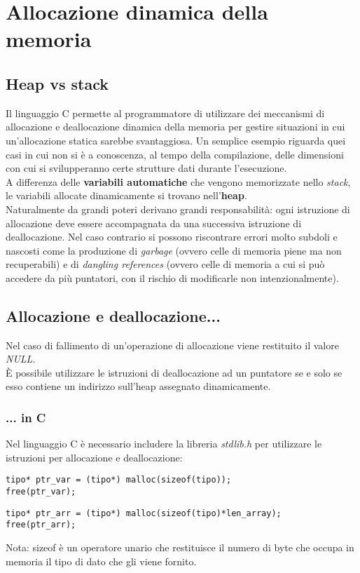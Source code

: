 \chapter{Allocazione dinamica della memoria}\label{memoriaDin}
\section{Heap vs stack}
Il linguaggio C permette al programmatore di utilizzare dei meccanismi di allocazione e deallocazione dinamica della memoria per gestire situazioni in cui un’allocazione statica sarebbe svantaggiosa. Un semplice esempio riguarda quei casi in cui non si è a conoscenza, al tempo della compilazione, delle dimensioni con cui si svilupperanno certe strutture dati durante l'esecuzione.\\
A differenza delle \textbf{variabili automatiche} che vengono memorizzate nello \textit{stack}, le variabili allocate dinamicamente si trovano nell'\textbf{heap}.\\
Naturalmente da grandi poteri derivano grandi responsabilità: ogni istruzione di allocazione deve essere accompagnata da una successiva istruzione di deallocazione. Nel caso contrario si possono riscontrare errori molto subdoli e nascosti come la produzione di \textit{garbage} (ovvero celle di memoria piene ma non recuperabili) e di \textit{dangling references} (ovvero celle di memoria a cui si può accedere da più puntatori, con il rischio di modificarle non intenzionalmente).

\section{Allocazione e deallocazione...}
Nel caso di fallimento di un'operazione di allocazione viene restituito il valore \textit{NULL}.\\
\`{E} possibile utilizzare le istruzioni di deallocazione ad un puntatore se e solo se esso contiene un indirizzo sull'heap assegnato dinamicamente.
\subsection{... in C}
Nel linguaggio C è necessario includere la libreria \textit{stdlib.h} per utilizzare le istruzioni per allocazione e deallocazione:
\begin{lstlisting}[title={Allocazione e deallocazione dinamica di una variabile in C}]
tipo* ptr_var = (tipo*) malloc(sizeof(tipo));
free(ptr_var);
\end{lstlisting}
\begin{lstlisting}[title={Allocazione e deallocazione dinamica di un vettore in C}]
tipo* ptr_arr = (tipo*) malloc(sizeof(tipo)*len_array);
free(ptr_arr);
\end{lstlisting}
Nota: \colorbox{light-gray}{sizeof} è un operatore unario che restituisce il numero di byte che occupa in memoria il tipo di dato che gli viene fornito.

